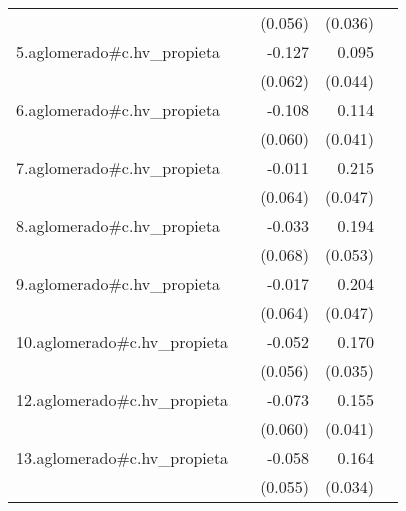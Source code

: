 {\begin{longtable}{l*{4}{D{.}{.}{-1}}}
            &                     &     (0.056)         &     (0.036)         &                     \\
\addlinespace
5.aglomerado#c.hv\_propieta&                     &      -0.127\sym{*}  &       0.095\sym{*}  &                     \\
            &                     &     (0.062)         &     (0.044)         &                     \\
\addlinespace
6.aglomerado#c.hv\_propieta&                     &      -0.108         &       0.114\sym{**} &                     \\
            &                     &     (0.060)         &     (0.041)         &                     \\
\addlinespace
7.aglomerado#c.hv\_propieta&                     &      -0.011         &       0.215\sym{***}&                     \\
            &                     &     (0.064)         &     (0.047)         &                     \\
\addlinespace
8.aglomerado#c.hv\_propieta&                     &      -0.033         &       0.194\sym{***}&                     \\
            &                     &     (0.068)         &     (0.053)         &                     \\
\addlinespace
9.aglomerado#c.hv\_propieta&                     &      -0.017         &       0.204\sym{***}&                     \\
            &                     &     (0.064)         &     (0.047)         &                     \\
\addlinespace
10.aglomerado#c.hv\_propieta&                     &      -0.052         &       0.170\sym{***}&                     \\
            &                     &     (0.056)         &     (0.035)         &                     \\
\addlinespace
12.aglomerado#c.hv\_propieta&                     &      -0.073         &       0.155\sym{***}&                     \\
            &                     &     (0.060)         &     (0.041)         &                     \\
\addlinespace
13.aglomerado#c.hv\_propieta&                     &      -0.058         &       0.164\sym{***}&                     \\
            &                     &     (0.055)         &     (0.034)         &                     \\

\end{longtable}}
